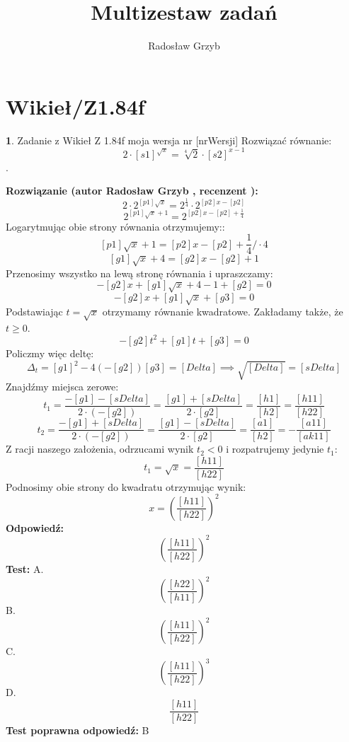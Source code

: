 \documentclass[12pt, a4paper]{article}
\title{Multizestaw zadań}
\author{Radosław Grzyb}
\date{}
\theoremstyle{definition} %
\newtheorem{zad}{}
\newcommand{\kategoria}[1]{\section{#1}} %
\newcommand{\zadStart}[1]{\begin{zad}#1\newline} %
\newcommand{\zadStop}{\end{zad}}   %
\newcommand{\rozwStart}[2]{\noindent \textbf{Rozwiązanie (autor #1 , recenzent #2): }\newline} %
\newcommand{\rozwStop}{\newline}                                            %
\newcommand{\odpStart}{\noindent \textbf{Odpowiedź:}\newline}    %
\newcommand{\odpStop}{\newline}                                             %
\newcommand{\testStart}{\noindent \textbf{Test:}\newline} %
\newcommand{\testStop}{\newline} %
\newcommand{\kluczStart}{\noindent \textbf{Test poprawna odpowiedź:}\newline} %
\newcommand{\kluczStop}{\newline} %
\begin{document}
\maketitle
\kategoria{Wikieł/Z1.84f}
\zadStart{Zadanie z Wikieł Z 1.84f moja wersja nr [nrWersji]}
Rozwiązać równanie:
$$2\cdot[s1]^{\sqrt{x}}=\sqrt[4]{2}\cdot[s2]^{x-1}$$.
\zadStop
\rozwStart{Radosław Grzyb}{}
$$2\cdot2^{[p1]\sqrt{x}}=2^{\frac{1}{4}}\cdot2^{[p2]x-[p2]}$$
$$2^{[p1]\sqrt{x}+1}=2^{[p2]x-[p2]+\frac{1}{4}}$$
Logarytmując obie strony równania otrzymujemy::
$$[p1]\sqrt{x}+1=[p2]x-[p2]+\frac{1}{4}/\cdot4$$
$$[g1]\sqrt{x}+4=[g2]x-[g2]+1$$
Przenosimy wszystko na lewą stronę równania i upraszczamy:
$$-[g2]x+[g1]\sqrt{x}+4-1+[g2]=0$$
$$-[g2]x+[g1]\sqrt{x}+[g3]=0$$
Podstawiając $t=\sqrt{x}$ otrzymamy równanie kwadratowe. Zakładamy także, że $t\geq0$.
$$-[g2]t^{2}+[g1]t+[g3]=0$$
Policzmy więc deltę:
$$\Delta_{t}=[g1]^2-4(-[g2])[g3]=[Delta]\implies\sqrt{[Delta]}=[sDelta]$$
Znajdźmy miejsca zerowe:
$$t_{1}=\frac{-[g1]-[sDelta]}{2\cdot(-[g2])}=\frac{[g1]+[sDelta]}{2\cdot[g2]}=\frac{[h1]}{[h2]}=\frac{[h11]}{[h22]}$$
$$t_{2}=\frac{-[g1]+[sDelta]}{2\cdot(-[g2])}=\frac{[g1]-[sDelta]}{2\cdot[g2]}=\frac{[a1]}{[h2]}=-\frac{[a11]}{[ak11]}$$
Z racji naszego założenia, odrzucami wynik $t_{2}<0$ i rozpatrujemy jedynie $t_{1}$:
$$t_{1}=\sqrt{x}=\frac{[h11]}{[h22]}$$
Podnosimy obie strony do kwadratu otrzymując wynik:
$$x=(\frac{[h11]}{[h22]})^{2}$$
\rozwStop
\odpStart
$$(\frac{[h11]}{[h22]})^{2}$$
\odpStop
\testStart
A.$$(\frac{[h22]}{[h11]})^{2}$$
B.$$(\frac{[h11]}{[h22]})^{2}$$
C.$$(\frac{[h11]}{[h22]})^{3}$$
D.$$\frac{[h11]}{[h22]}$$
\testStop
\kluczStart
B
\kluczStop
\end{document}
